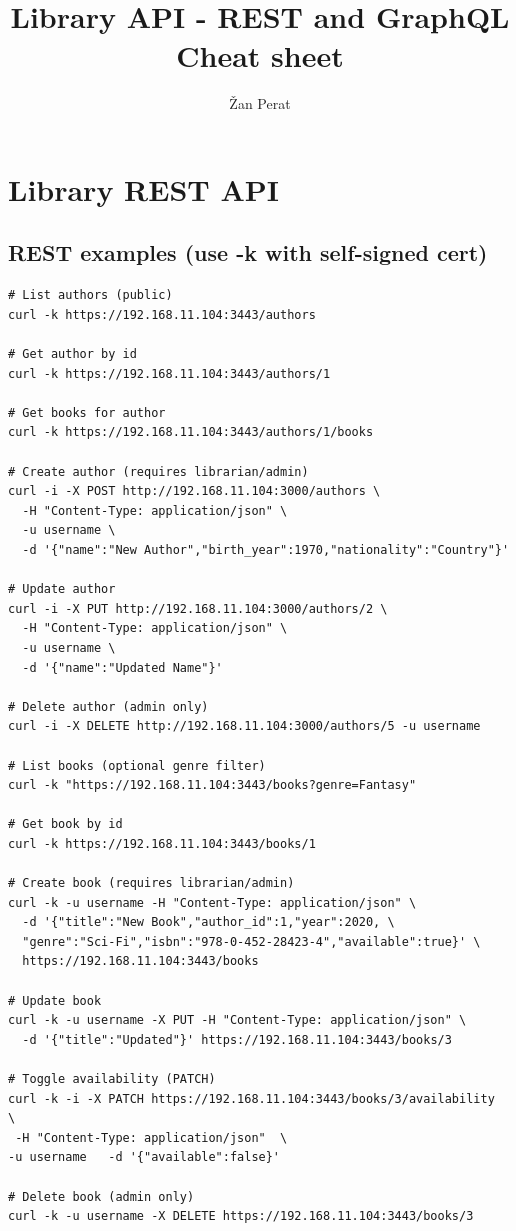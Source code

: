 \documentclass[11pt]{article}
\title{Library API - REST and GraphQL Cheat sheet}
\author{Žan Perat}
\date{}
\begin{document}
\maketitle

\section{Library REST API}

\subsection*{REST examples (use -k with self-signed cert)}
\begin{verbatim}
# List authors (public)
curl -k https://192.168.11.104:3443/authors

# Get author by id
curl -k https://192.168.11.104:3443/authors/1

# Get books for author
curl -k https://192.168.11.104:3443/authors/1/books

# Create author (requires librarian/admin)
curl -i -X POST http://192.168.11.104:3000/authors \
  -H "Content-Type: application/json" \
  -u username \
  -d '{"name":"New Author","birth_year":1970,"nationality":"Country"}'

# Update author
curl -i -X PUT http://192.168.11.104:3000/authors/2 \
  -H "Content-Type: application/json" \
  -u username \
  -d '{"name":"Updated Name"}'

# Delete author (admin only)
curl -i -X DELETE http://192.168.11.104:3000/authors/5 -u username

# List books (optional genre filter)
curl -k "https://192.168.11.104:3443/books?genre=Fantasy"

# Get book by id
curl -k https://192.168.11.104:3443/books/1

# Create book (requires librarian/admin)
curl -k -u username -H "Content-Type: application/json" \
  -d '{"title":"New Book","author_id":1,"year":2020, \
  "genre":"Sci-Fi","isbn":"978-0-452-28423-4","available":true}' \
  https://192.168.11.104:3443/books

# Update book
curl -k -u username -X PUT -H "Content-Type: application/json" \
  -d '{"title":"Updated"}' https://192.168.11.104:3443/books/3

# Toggle availability (PATCH)
curl -k -i -X PATCH https://192.168.11.104:3443/books/3/availability  \
 -H "Content-Type: application/json"  \
-u username   -d '{"available":false}'

# Delete book (admin only)
curl -k -u username -X DELETE https://192.168.11.104:3443/books/3
\end{verbatim}
\end{document}
